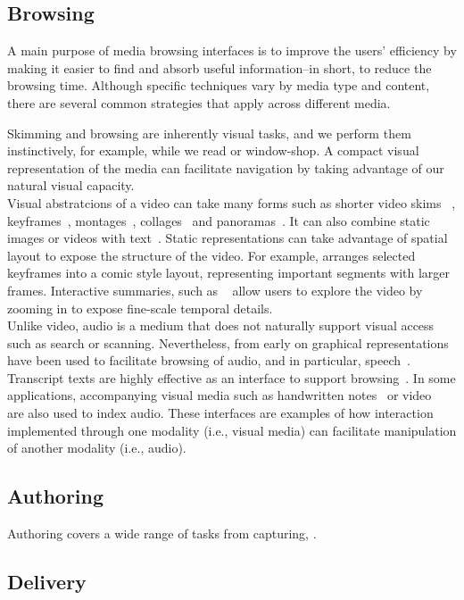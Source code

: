 \subsection{Browsing}
A main purpose of media browsing interfaces is to improve the users' efficiency by making it easier to find and absorb useful information--in short, to reduce the browsing time. Although specific techniques vary by media type and content, there are several common strategies that apply across different media. 
%
\begin{mldescription}
 Skimming and browsing are inherently visual tasks, and we perform them instinctively, for example, while we read or window-shop. A compact visual representation of the media can facilitate navigation by taking advantage of our natural visual capacity. \\
Visual abstratcions of a video can take many forms such as shorter video skims ~\cite{chu2015video,lu2013story}, keyframes~\cite{kim2014joint,khosla2013large}, montages~\cite{sun2014salient}, collages~\cite{wang2007video} and panoramas~\cite{liu2008discovering,choudary2007summarization}. It can also combine static images or videos with text~\cite{papernick2005summarization}. Static representations can take advantage of spatial layout to expose the structure of the video. For example, \cite{boreczky2000interactive} arranges selected keyframes into a comic style layout, representing important segments with larger frames. Interactive summaries, such as ~\cite{barnes2010video} allow users to explore the video by zooming in to expose fine-scale temporal details.\\
Unlike video, audio is a medium that does not naturally support visual access such as search or scanning. Nevertheless, from early on graphical representations have been used to facilitate browsing of audio, and in particular, speech~\cite{schmandt1981intelligent,degen1992working}. Transcript texts are highly effective as an interface to support browsing~\cite{schmandt1981intelligent,whittaker1999scan}. In some applications, accompanying visual media such as handwritten notes~\cite{whittaker1994filochat,stifelman2001audio} or video~\cite{kazman1996four,hauptmann1997informedia} are also used to index audio. These interfaces are examples of how interaction implemented through one modality (i.e., visual media) can facilitate manipulation of another modality (i.e., audio).\\ 
\end{mldescription}

\subsection{Authoring}
Authoring covers a wide range of tasks from capturing, . 

\subsection{Delivery}


 

